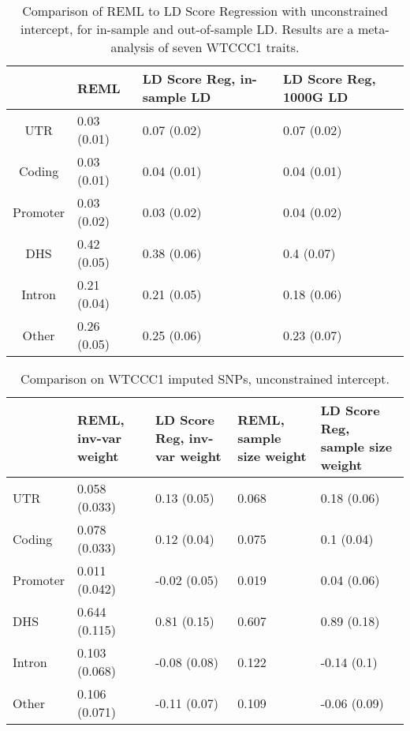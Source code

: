\documentclass[11pt]{article}
\begin{document}
\begin{table}
\begin{center}
\begin{tabular}[h]{c| l p{2.5cm} p{2.5cm}}
& REML & LD Score Reg, in-sample LD & LD Score Reg, 1000G LD\\
\hline
UTR & 0.03 (0.01) & 0.07 (0.02) & 0.07 (0.02) \\
Coding & 0.03 (0.01) & 0.04 (0.01) & 0.04 (0.01) \\
Promoter & 0.03 (0.02) & 0.03 (0.02) & 0.04 (0.02) \\
DHS & 0.42 (0.05) & 0.38 (0.06) & 0.4 (0.07) \\
Intron & 0.21 (0.04) & 0.21 (0.05) & 0.18 (0.06) \\
Other & 0.26 (0.05) & 0.25 (0.06) & 0.23 (0.07) \\
\end{tabular}
\end{center}
\caption{Comparison of REML to LD Score Regression with unconstrained intercept, for in-sample and out-of-sample LD. Results are a meta-analysis of seven WTCCC1 traits.}
\label{WT1.2}
\end{table}

\begin{table}[H]
\begin{center}
\begin{tabular}[h]{ p{2.5cm} | l p{2.5cm}  p{2.5cm}  p{2.5cm}}
& REML, inv-var weight & LD Score Reg, inv-var weight & REML, sample size weight & LD Score Reg, sample size weight\\
\hline
UTR & 0.058 (0.033) & 0.13 (0.05) & 0.068 & 0.18 (0.06)\\
Coding & 0.078 (0.033) & 0.12 (0.04) & 0.075 & 0.1 (0.04)\\
Promoter & 0.011 (0.042) & -0.02 (0.05) & 0.019 & 0.04 (0.06)\\
DHS & 0.644 (0.115) & 0.81 (0.15) & 0.607 & 0.89 (0.18)\\
Intron & 0.103 (0.068) & -0.08 (0.08) & 0.122 & -0.14 (0.1)\\
Other & 0.106 (0.071) & -0.11 (0.07) & 0.109 & -0.06 (0.09)\\
\end{tabular}
\caption{Comparison on WTCCC1 imputed SNPs, unconstrained intercept.}
\end{center}
\end{table}
\end{document}
